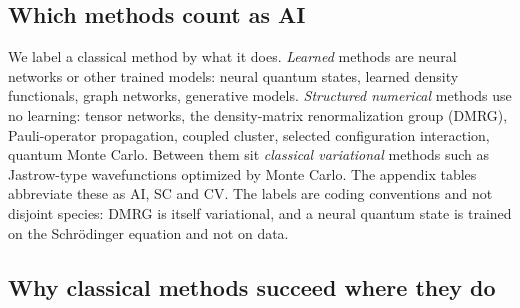 \documentclass[10pt,a4paper]{article}
\begin{document}
\subsection{Which methods count as AI}
We label a classical method by what it does. \emph{Learned} methods are neural networks or other trained models: neural quantum states, learned density functionals, graph networks, generative models. \emph{Structured numerical} methods use no learning: tensor networks, the density-matrix renormalization group (DMRG), Pauli-operator propagation, coupled cluster, selected configuration interaction, quantum Monte Carlo. Between them sit \emph{classical variational} methods such as Jastrow-type wavefunctions optimized by Monte Carlo. The appendix tables abbreviate these as AI, SC and CV. The labels are coding conventions and not disjoint species: DMRG is itself variational, and a neural quantum state is trained on the Schr\"odinger equation and not on data.

\subsection{Why classical methods succeed where they do}
\label{sec:why}
\end{document}
